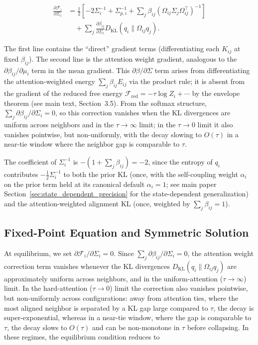 \documentclass[twoside,11pt]{article}
\begin{document}
\begin{equation}
\boxed{
\begin{aligned}
\frac{\partial \mathcal{F}_i}{\partial \Sigma_i}
&=\frac{1}{2}
\left[
-2 \Sigma_i^{-1}
+ \Sigma_{p,i}^{-1}
+ \sum_j \beta_{ij}
(\Omega_{ij}\Sigma_j\Omega_{ij}^\top)^{-1}
\right] \\
&\quad + \sum_j \frac{\partial \beta_{ij}}{\partial \Sigma_i}
D_{\mathrm{KL}}(q_i \| \Omega_{ij} q_j).
\end{aligned}
}
\label{eq:Sigma_gradient_final}
\end{equation}

The first line contains the ``direct'' gradient terms (differentiating each $K_{ij}$ at fixed $\beta_{ij}$). The second line is the attention weight gradient, analogous to the $\partial \beta_{ij}/\partial \mu_i$ term in the mean gradient. This $\partial\beta/\partial\Sigma$ term arises from differentiating the attention-weighted energy $\sum_j \beta_{ij} E_{ij}$ via the product rule; it is absent from the gradient of the reduced free energy $\mathcal{F}_{\mathrm{red}} = -\tau\log Z_i + \cdots$ by the envelope theorem (see main text, Section~3.5). From the softmax structure, $\sum_j \partial \beta_{ij}/\partial \Sigma_i = 0$, so this correction vanishes when the KL divergences are uniform across neighbors and in the $\tau \to \infty$ limit; in the $\tau \to 0$ limit it also vanishes pointwise, but non-uniformly, with the decay slowing to $O(\tau)$ in a near-tie window where the neighbor gap is comparable to $\tau$.

The coefficient of $\Sigma_i^{-1}$ is $-(1 + \sum_j \beta_{ij}) = -2$, since the entropy of $q_i$ contributes $-\frac{1}{2}\Sigma_i^{-1}$ to both the prior KL (once, with the self-coupling weight $\alpha_i$ on the prior term held at its canonical default $\alpha_i = 1$; see main paper Section~\ref{sec:state_dependent_precision} for the state-dependent generalization) and the attention-weighted alignment KL (once, weighted by $\sum_j \beta_{ij} = 1$).

\subsection{Fixed-Point Equation and Symmetric Solution}

At equilibrium, we set $\partial \mathcal{F}_i / \partial \Sigma_i = 0$. Since $\sum_j \partial \beta_{ij}/\partial \Sigma_i = 0$, the attention weight correction term vanishes whenever the KL divergences $D_{\mathrm{KL}}(q_i \| \Omega_{ij}q_j)$ are approximately uniform across neighbors, and in the uniform-attention ($\tau \to \infty$) limit. In the hard-attention ($\tau \to 0$) limit the correction also vanishes pointwise, but non-uniformly across configurations: away from attention ties, where the most aligned neighbor is separated by a KL gap large compared to $\tau$, the decay is super-exponential, whereas in a near-tie window, where the gap is comparable to $\tau$, the decay slows to $O(\tau)$ and can be non-monotone in $\tau$ before collapsing. In these regimes, the equilibrium condition reduces to
\end{document}
